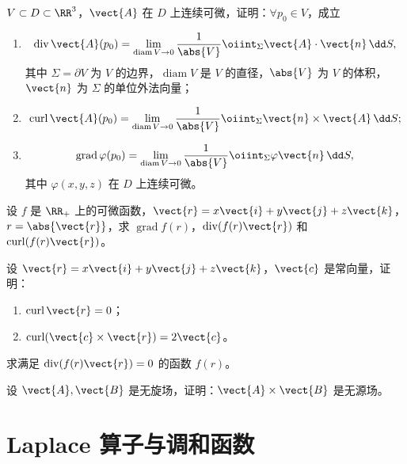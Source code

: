 \begin{xexercise}[3]
$V\subset D\subset\RR^3$，$\vect{A}$ 在 $D$ 上连续可微，证明：$\forall p_0\in V$，成立
\begin{enumerate}[label=(\arabic*)]
  \item
  \[
    \operatorname{div}\vect{A}(p_0)
    =\lim_{\operatorname{diam}V\to0}\frac{1}{\abs{V}}
    \oiint_\Sigma\vect{A}\cdot\vect{n}\,\dd S,
  \]
  其中 $\Sigma=\partial V$ 为 $V$ 的边界，$\operatorname{diam}V$ 是 $V$ 的直径，$\abs{V}$ 为 $V$ 的体积，$\vect{n}$ 为 $\Sigma$ 的单位外法向量；
  \item
  \[
    \operatorname{curl}\vect{A}(p_0)
    =\lim_{\operatorname{diam}V\to0}\frac{1}{\abs{V}}
    \oiint_\Sigma\vect{n}\times\vect{A}\,\dd S;
  \]
  \item
  \[
    \operatorname{grad}\varphi(p_0)
    =\lim_{\operatorname{diam}V\to0}\frac{1}{\abs{V}}
    \oiint_\Sigma\varphi\vect{n}\,\dd S,
  \]
  其中 $\varphi(x,y,z)$ 在 $D$ 上连续可微。
\end{enumerate}
\end{xexercise}

\begin{xexercise}[4]
设 $f$ 是 $\RR_+$ 上的可微函数，$\vect{r}=x\vect{i}+y\vect{j}+z\vect{k}$，$r=\abs{\vect{r}}$，求 $\operatorname{grad}f(r)$，$\operatorname{div}(f(r)\vect{r})$ 和 $\operatorname{curl}(f(r)\vect{r})$。
\end{xexercise}

\begin{xexercise}[5]
设 $\vect{r}=x\vect{i}+y\vect{j}+z\vect{k}$，$\vect{c}$ 是常向量，证明：
\begin{enumerate}[label=(\arabic*)]
  \item $\operatorname{curl}\vect{r}=0$；
  \item $\operatorname{curl}(\vect{c}\times\vect{r})=2\vect{c}$。
\end{enumerate}
\end{xexercise}

\begin{xexercise}[6]
求满足 $\operatorname{div}(f(r)\vect{r})=0$ 的函数 $f(r)$。
\end{xexercise}

\begin{xexercise}[7]
设 $\vect{A},\vect{B}$ 是无旋场，证明：$\vect{A}\times\vect{B}$ 是无源场。
\end{xexercise}

\section{Laplace 算子与调和函数}

